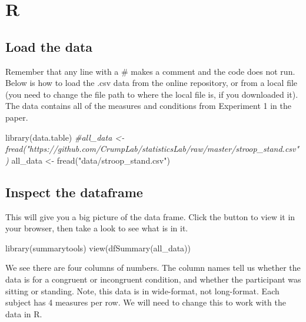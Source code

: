 \documentclass[
]{book}
\newenvironment{Shaded}{\begin{snugshade}}{\end{snugshade}}
\newcommand{\CommentTok}[1]{\textcolor[rgb]{0.56,0.35,0.01}{\textit{#1}}}
\newcommand{\FunctionTok}[1]{\textcolor[rgb]{0.00,0.00,0.00}{#1}}
\newcommand{\NormalTok}[1]{#1}
\newcommand{\OtherTok}[1]{\textcolor[rgb]{0.56,0.35,0.01}{#1}}
\newcommand{\StringTok}[1]{\textcolor[rgb]{0.31,0.60,0.02}{#1}}
\begin{document}
\hypertarget{r-10}{%
\section{R}\label{r-10}}

\hypertarget{load-the-data-4}{%
\subsection{Load the data}\label{load-the-data-4}}

Remember that any line with a \# makes a comment and the code does not run. Below is how to load the .csv data from the online repository, or from a local file (you need to change the file path to where the local file is, if you downloaded it). The data contains all of the measures and conditions from Experiment 1 in the paper.

\begin{Shaded}
\begin{Highlighting}[]
\FunctionTok{library}\NormalTok{(data.table)}
\CommentTok{\#all\_data \textless{}{-} fread("https://github.com/CrumpLab/statisticsLab/raw/master/stroop\_stand.csv")}
\NormalTok{all\_data }\OtherTok{\textless{}{-}} \FunctionTok{fread}\NormalTok{(}\StringTok{"data/stroop\_stand.csv"}\NormalTok{)}
\end{Highlighting}
\end{Shaded}

\hypertarget{inspect-the-dataframe-2}{%
\subsection{Inspect the dataframe}\label{inspect-the-dataframe-2}}

This will give you a big picture of the data frame. Click the button to view it in your browser, then take a look to see what is in it.

\begin{Shaded}
\begin{Highlighting}[]
\FunctionTok{library}\NormalTok{(summarytools)}
\FunctionTok{view}\NormalTok{(}\FunctionTok{dfSummary}\NormalTok{(all\_data))}
\end{Highlighting}
\end{Shaded}

We see there are four columns of numbers. The column names tell us whether the data is for a congruent or incongruent condition, and whether the participant was sitting or standing. Note, this data is in wide-format, not long-format. Each subject has 4 measures per row. We will need to change this to work with the data in R.
\end{document}
